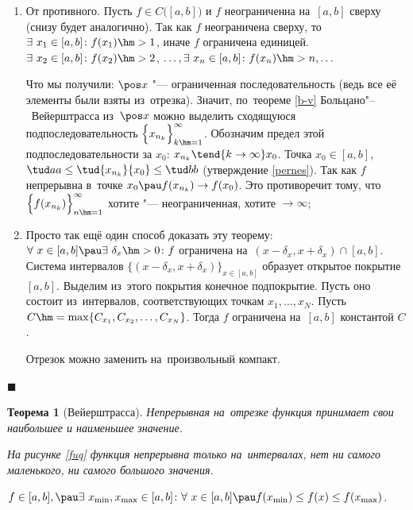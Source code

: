 \documentclass[a4paper,10pt,twoside]{article}
\newtheorem{The}{Теорема}[section]
\newenvironment{Proof}
       {\par\noindent{\textbf{Доказательство.}}}
       {\hfill$\scriptstyle\blacksquare$}
\begin{document}
\begin{Proof}
\begin{enumerate}
    \item От противного. Пусть $f\in C\big([a,b]\big)$ и $f$ неограниченна на~$[a,b]$ сверху (снизу будет аналогично).
    Так как $f$ неограничена сверху, то $\exists\  x_1\in [a,b]\colon f(x_1)\hm>1$, иначе $f$ ограничена единицей.
    $\exists\  x_2\in[a,b]\colon f(x_2)\hm>2$, $\ldots,\exists\  x_n\in[a,b]\colon
        f(x_n)\hm>n,\ldots$

        Что мы получили: $\pos x$ "--- ограниченная последовательность (ведь все её элементы были взяты из~отрезка). Значит,
        по~теореме \ref{b-v} Больцано"--~Вейерштрасса из~$\pos x$
        можно выделить сходящуюся подпоследовательность
        $\Big\{x_{n_k}\Big\}_{k\hm=1}^\infty$. Обозначим предел этой подпоследовательности за $x_0$: $x_{n_k}\tend{k\to\infty}x_0$. Точка $x_0\in [a,b]$,
        $\tud aa\leq\tud{x_{n_k}}{x_0}\leq\tud bb$ (утверждение \ref{pernes}). Так как $f$ непрерывна в~точке $x_0\pau f(x_{n_k})\to f(x_0)$.
         Это противоречит тому, что $\Big\{f(x_{n_k})\Big\}_{n\hm=1}^\infty$ хотите "--- неограниченная, хотите $\to\infty$;

        \item Просто так ещё один способ доказать эту теорему: $\forall\  x\in [a,b]\pau \exists\  \delta_x\hm>0\colon
            f$ ограничена на~$(x-\delta_x,x+\delta_x)\cap[a,b]$.
            Система интервалов
            $\Big\{(x-\delta_x,x+\delta_x)\Big\}_{x\in[a,b]}$ образует открытое покрытие $[a,b]$.
            Выделим из~этого покрытия конечное подпокрытие. Пусть оно состоит из~интервалов, соответствующих точкам $x_1,\ldots,x_N$. Пусть
            $C\hm=\max\{C_{x_1},C_{x_2},\ldots,C_{x_N}\}$. Тогда $f$ ограничена на~$[a,b]$ константой $C$.

            Отрезок можно заменить на~произвольный компакт.
\end{enumerate}
\end{Proof}

\begin{The}[Вейерштрасса]\label{vmaxmin} Непрерывная на~отрезке функция принимает свои наибольшее и наименьшее значение.


На рисунке \ref{fuq} функция непрерывна только на~интервалах, нет
  ни самого маленького, ни самого большого значения.

$f\in[a,b],\pau \exists\  x_{\min},x_{\max}\in[a,b]\colon
\forall\  x\in[a,b]\pau f(x_{\min})\leq f(x)\leq f(x_{\max})$.
\end{The}
\end{document}
